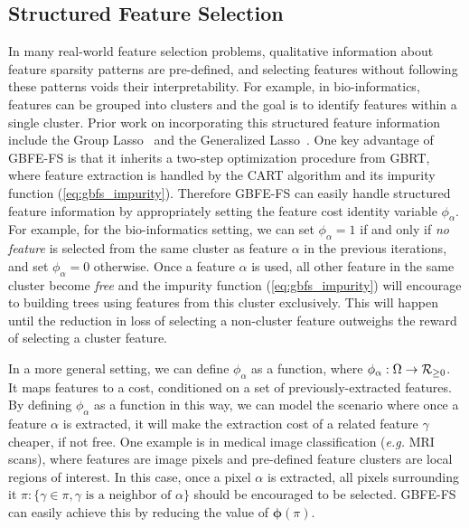 \subsection{Structured Feature Selection}
\label{sec:structure}
In many real-world feature selection problems, qualitative information about feature sparsity patterns are pre-defined, and selecting features without following these patterns voids their interpretability. For example, in bio-informatics, features can be grouped into clusters and the goal is to identify features within a single cluster. Prior work on incorporating this structured feature information include the Group Lasso~\citep{huang2011learning,roth2008group} and the Generalized Lasso~\citep{roth2004generalized}. One key advantage of GBFE-FS is that it inherits a two-step optimization procedure from GBRT, where feature extraction is handled by the CART algorithm and its impurity function (\ref{eq:gbfs_impurity}). Therefore GBFE-FS can easily handle structured feature information by appropriately setting the feature cost identity variable $\phi_\alpha$. For example, for the bio-informatics setting, we can set $\phi_\alpha = 1$ if and only if \emph{no feature} is selected from the same cluster as feature $\alpha$ in the previous iterations, and set $\phi_\alpha = 0$ otherwise. Once a feature $\alpha$ is used, all other feature in the same cluster become \emph{free} and the impurity function (\ref{eq:gbfs_impurity}) will encourage to building trees using features from this cluster exclusively. This will happen until the reduction in loss of selecting a non-cluster feature outweighs the reward of selecting a cluster feature.

In a more general setting, we can define $\phi_\alpha$ as a function, where $\mbox{$\phi_\alpha:\Omega\rightarrow{\cal R}_{\geq0}$}$. It maps features to a cost, conditioned on a set of previously-extracted features. By defining $\phi_\alpha$ as a function in this way, we can model the scenario where once a feature $\alpha$ is extracted, it will make the extraction cost of a related feature $\gamma$ cheaper, if not free. One example is in medical image classification (\emph{e.g.} MRI scans), where features are image pixels and pre-defined feature clusters are local regions of interest. In this case, once a pixel $\alpha$ is extracted, all pixels surrounding it $\pi: \{\gamma \in \pi, \gamma \textrm{ is a neighbor of } \alpha\}$ should be encouraged to be selected. GBFE-FS can easily achieve this by reducing the value of $\boldsymbol{\phi}(\pi)$.



